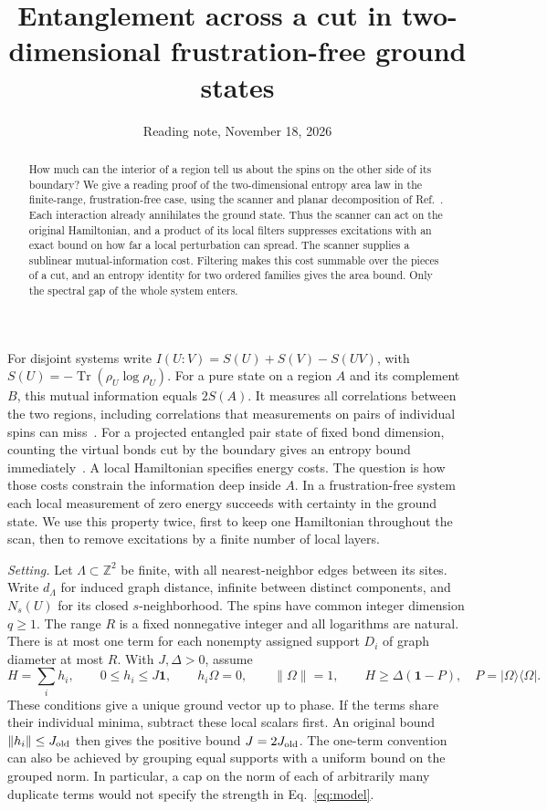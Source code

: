 \documentclass[aps,prb,onecolumn,10pt,nofootinbib]{revtex4-2}
\newcommand{\id}{\mathbf{1}}
\newcommand{\tr}{\operatorname{Tr}}
\providecommand{\ket}[1]{\lvert #1\rangle}
\providecommand{\bra}[1]{\langle #1\rvert}
\newcommand{\norm}[1]{\lVert #1\rVert}
\begin{document}
\title{Entanglement across a cut in two-dimensional frustration-free ground states}
\date{Reading note, November 18, 2026}
\begin{abstract}
How much can the interior of a region tell us about the spins on the other side of its boundary?
We give a reading proof of the two-dimensional entropy area law in the finite-range, frustration-free case, using the scanner and planar decomposition of Ref.~\cite{area}. Each interaction already annihilates the ground state. Thus the scanner can act on the original Hamiltonian, and a product of its local filters suppresses excitations with an exact bound on how far a local perturbation can spread. The scanner supplies a sublinear mutual-information cost. Filtering makes this cost summable over the pieces of a cut, and an entropy identity for two ordered families gives the area bound. Only the spectral gap of the whole system enters.
\end{abstract}
\maketitle

For disjoint systems write $I(U:V)=S(U)+S(V)-S(UV)$, with $S(U)=-\tr(\rho_U\log\rho_U)$. For a pure state on a region $A$ and its complement $B$, this mutual information equals $2S(A)$. It measures all correlations between the two regions, including correlations that measurements on pairs of individual spins can miss~\cite{wolf}. For a projected entangled pair state of fixed bond dimension, counting the virtual bonds cut by the boundary gives an entropy bound immediately~\cite{cirac}. A local Hamiltonian specifies energy costs. The question is how those costs constrain the information deep inside $A$. In a frustration-free system each local measurement of zero energy succeeds with certainty in the ground state. We use this property twice, first to keep one Hamiltonian throughout the scan, then to remove excitations by a finite number of local layers.

\emph{Setting.}
Let $\Lambda\subset\mathbb Z^2$ be finite, with all nearest-neighbor edges between its sites. Write $d_\Lambda$ for induced graph distance, infinite between distinct components, and $N_s(U)$ for its closed $s$-neighborhood. The spins have common integer dimension $q\ge1$. The range $R$ is a fixed nonnegative integer and all logarithms are natural. There is at most one term for each nonempty assigned support $D_i$ of graph diameter at most $R$. With $J,\Delta>0$, assume
\begin{equation}
 H=\sum_i h_i,\qquad 0\le h_i\le J\id,\qquad
 h_i\Omega=0,\qquad \norm{\Omega}=1,\qquad
 H\ge\Delta(\id-P),\quad P=\ket{\Omega}\bra{\Omega}.
 \label{eq:model}
\end{equation}
These conditions give a unique ground vector up to phase. If the terms share their individual minima, subtract these local scalars first. An original bound $\norm{h_i}\le J_{\rm old}$ then gives the positive bound $J=2J_{\rm old}$. The one-term convention can also be achieved by grouping equal supports with a uniform bound on the grouped norm. In particular, a cap on the norm of each of arbitrarily many duplicate terms would not specify the strength in Eq.~\eqref{eq:model}.
\end{document}
